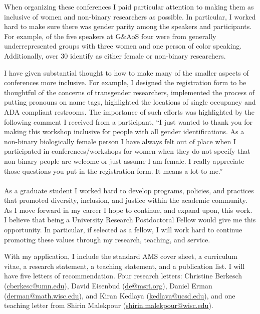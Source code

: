 \documentclass[11pt]{article}
\begin{document}
When organizing these conferences I paid particular attention to making them as inclusive of women and non-binary researchers as possible. In particular, I worked hard to make sure there was gender parity among the speakers and participants.  For example, of the five speakers at G\&AoS four were from generally underrepresented groups with three women and one person of color speaking. Additionally, over 30 identify as either female or non-binary researchers. 

I have given substantial thought to how to make many of the smaller aspects of conferences more inclusive. For example, I designed the registration form to be thoughtful of the concerns of transgender researchers, implemented the process of putting pronouns on name tags, highlighted the locations of single occupancy and ADA compliant restrooms. The importance of such efforts was highlighted by the following comment I received from a participant, ``I just wanted to thank you for making this workshop inclusive for people with all gender identifications. As a non-binary biologically female person I have always felt out of place when I participated in conferences/workshops for women when they do not specify that non-binary people are welcome or just assume I am female. I really appreciate those questions you put in the registration form. It means a lot to me.''
\\
\\
As a graduate student I worked hard to develop programs, policies, and practices that promoted diversity, inclusion, and justice within the academic community. As I move forward in my career I hope to continue, and expand upon, this work. I believe that being a University Research Postdoctoral Fellow would give me this opportunity.  In particular, if selected as a fellow, I will work hard to continue promoting these values through my research, teaching, and service. 

With my application, I include the standard AMS cover sheet, a curriculum vitae, a research statement, a teaching statement, and a publication list. I will have five letters of recommendation. Four research letters: Christine Berkesch (\href{mailto:cberkesc@umn.edu}{cberkesc@umn.edu}), David Eisenbud (\href{mailto:de@msri.org}{de@msri.org}), Daniel Erman (\href{mailto:derman@math.wisc.edu}{derman@math.wisc.edu}), and Kiran Kedlaya (\href{mailto:kedlaya@ucsb.edu}{kedlaya@ucsd.edu}), and one teaching letter from Shirin Malekpour (\href{mailto:shirin.malekpour@wisc.edu}{shirin.malekpour@wisc.edu}).
\end{document}
